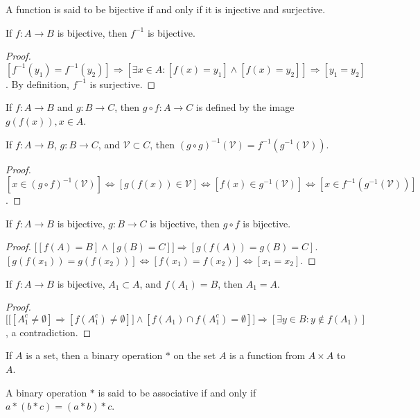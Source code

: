 \documentclass[crop=false,class=book]{standalone}
\begin{document}
\begin{definition}
A function is said to be bijective if and only if it is injective and surjective.
\end{definition}
\begin{theorem}
If $f:A\rightarrow B$ is bijective, then $f^{-1}$ is bijective.
\end{theorem}
\begin{proof}
$[f^{-1}(y_1) = f^{-1}(y_2)]\Rightarrow [\exists x\in A:[f(x) = y_1]\land [f(x)=y_2]]\Rightarrow [y_1=y_2]$. By definition, $f^{-1}$ is surjective.
\end{proof}
\begin{definition}
If $f:A\rightarrow B$ and $g:B\rightarrow C$, then $g\circ f:A\rightarrow C$ is defined by the image $g(f(x)), x\in A$. 
\end{definition}
\begin{theorem}
If $f:A\rightarrow B$, $g:B\rightarrow C$, and $\mathcal{V}\subset C$, then $(g\circ g)^{-1}(\mathcal{V}) = f^{-1}(g^{-1}(\mathcal{V}))$.
\end{theorem}
\begin{proof}
$[x\in (g\circ f)^{-1}(\mathcal{V})]\Leftrightarrow [g(f(x))\in \mathcal{V}] \Leftrightarrow [f(x)\in g^{-1}(\mathcal{V})]\Leftrightarrow [x\in f^{-1}(g^{-1}(\mathcal{V}))]$.
\end{proof}
\begin{theorem}
If $f:A\rightarrow B$ is bijective, $g:B\rightarrow C$ is bijective, then $g\circ f$ is bijective.
\end{theorem}
\begin{proof}
$\big[[f(A) = B]\land [g(B) = C]\big]\Rightarrow [g(f(A)) = g(B) = C]$. $[g(f(x_1))=g(f(x_2))]\Leftrightarrow [f(x_1)=f(x_2)]\Leftrightarrow [x_1=x_2]$.
\end{proof}
\begin{theorem}
If $f:A\rightarrow B$ is bijective, $A_1\subset A$, and $f(A_1) = B$, then $A_1=A$.
\end{theorem}
\begin{proof}
$\Big[\big[[A_1^c \ne \emptyset]\Rightarrow [f(A_1^c) \ne \emptyset]\big]\land[f(A_1)\cap f(A_1^c) = \emptyset]\Big]\Rightarrow [\exists y\in B:y\notin f(A_1)]$, a contradiction.
\end{proof}
\begin{definition}
If $A$ is a set, then a binary operation $*$ on the set $A$ is a function from $A\times A$ to $A$.
\end{definition}
\begin{definition}
A binary operation $*$ is said to be associative if and only if $a*(b*c) = (a*b)*c$.
\end{definition}
\end{document}
